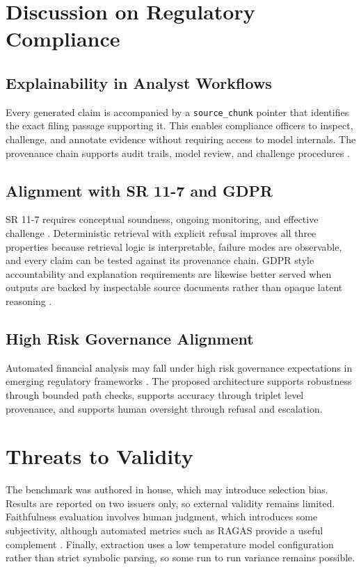\documentclass[conference]{IEEEtran}
\begin{document}
\section{Discussion on Regulatory Compliance}
\subsection{Explainability in Analyst Workflows}
Every generated claim is accompanied by a \texttt{source\_chunk} pointer that identifies the exact filing passage supporting it. This enables compliance officers to inspect, challenge, and annotate evidence without requiring access to model internals. The provenance chain supports audit trails, model review, and challenge procedures \cite{ieeeeadd,kearns2019ethical}.

\subsection{Alignment with SR 11-7 and GDPR}
SR 11-7 requires conceptual soundness, ongoing monitoring, and effective challenge \cite{sr117}. Deterministic retrieval with explicit refusal improves all three properties because retrieval logic is interpretable, failure modes are observable, and every claim can be tested against its provenance chain. GDPR style accountability and explanation requirements are likewise better served when outputs are backed by inspectable source documents rather than opaque latent reasoning \cite{gdpr,nistairmf,euaiact2024}.

\subsection{High Risk Governance Alignment}
Automated financial analysis may fall under high risk governance expectations in emerging regulatory frameworks \cite{euaiact2024,occaiprinciples,fcaai2024}. The proposed architecture supports robustness through bounded path checks, supports accuracy through triplet level provenance, and supports human oversight through refusal and escalation.

\section{Threats to Validity}
The benchmark was authored in house, which may introduce selection bias. Results are reported on two issuers only, so external validity remains limited. Faithfulness evaluation involves human judgment, which introduces some subjectivity, although automated metrics such as RAGAS provide a useful complement \cite{ragas2023}. Finally, extraction uses a low temperature model configuration rather than strict symbolic parsing, so some run to run variance remains possible.
\end{document}
